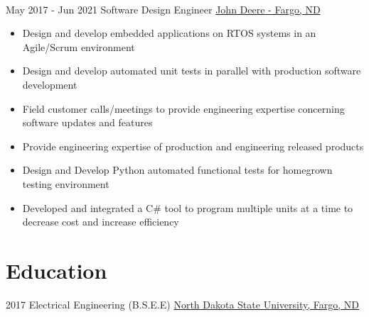 \documentclass[letterpaper]{tenseconds} %
\begin{document}
\begin{twenty}
{\begin{itemize}
		\end{itemize}}
   \\
	\twentyitem
	{May 2017 -}
	{Jun 2021}
	{Software Design Engineer}
	{\href{https://www.deere.com/en/index.html}{John Deere - Fargo, ND}}
	{}
	{\begin{itemize}
		\item Design and develop embedded applications on RTOS systems in an Agile/Scrum environment
		\item Design and develop automated unit tests in parallel with production software development
		\item Field customer calls/meetings to provide engineering expertise concerning software updates and features
    \item Provide engineering expertise of production and engineering released products
    \item Design and Develop Python automated functional tests for homegrown testing environment
    \item Developed and integrated a C\# tool to program multiple units at a time to decrease cost and increase efficiency
		\end{itemize}}
\end{twenty}

\section{Education}
\begin{twenty} %
	\twentyitem
	{2017}
	{}
	{Electrical Engineering \textnormal{(B.S.E.E)}}
	{\href{https://www.ndsu.edu/}{North Dakota State University, Fargo, ND}}
	{}
	{}
\end{twenty}
\end{document}
